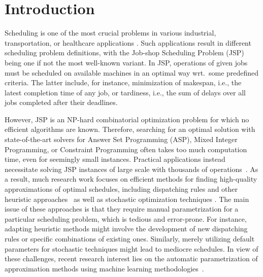 \documentclass[runningheads]{llncs}
\begin{document}
\section{Introduction}
Scheduling is one of the most crucial problems in various industrial, transportation, or healthcare applications
 \cite{pezzella2008genetic,chaudhry2016research,nouiri2018effective,demirbilek2019dynamically,schoenfelder2020nurse,wang2019routing,janakbhai2021blockchain}. 
%
Such applications result in different scheduling problem definitions, with the Job-shop Scheduling Problem (JSP) \cite{taillard1993benchmarks} being one if not the most well-known variant.
In JSP, operations of given jobs must be scheduled on available machines in an optimal way wrt.\ some predefined criteria. The latter include, for instance, minimization of makespan, i.e., the latest completion time of any job, or tardiness, i.e., the sum of delays over all jobs completed after their deadlines. 

However, JSP is an NP-hard combinatorial optimization problem \cite{garey1976complexity,SOTSKOV1995237} for which no efficient algorithms are known. Therefore, searching for an optimal solution with state-of-the-art solvers for Answer Set Programming (ASP), Mixed Integer Programming, or Constraint Programming \cite{meng2020mixed,coltep19a,el2020job,al2017job}
often takes too much computation time, even for seemingly small instances. Practical applications instead necessitate solving JSP instances of large scale with thousands of operations~\cite{zhang2010hybrid}.
As a result, much research work focuses on %
efficient methods for finding high-quality approximations of optimal schedules, including dispatching rules and other heuristic approaches~\cite{blackstone1982state} as well as stochastic optimization techniques \cite{DBLP:journals/informs/VaessensAL96,DBLP:journals/jim/CalisB15}.  
The main issue of these approaches is that they require manual parametrization for a particular scheduling problem, which is tedious and error-prone. For instance, adapting heuristic methods might involve the development of new dispatching rules or specific combinations of existing ones. Similarly, merely utilizing default parameters for stochastic techniques might lead to mediocre schedules.    
In view of these challenges, recent research interest lies on the automatic parametrization of approximation methods using machine learning methodologies~\cite{bengio2020machine}.
\end{document}
